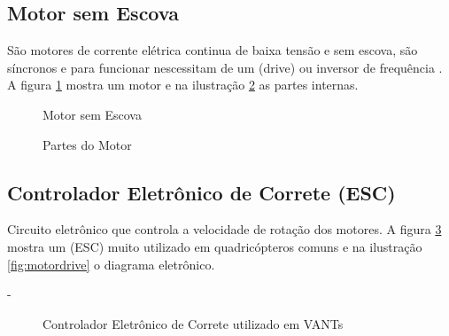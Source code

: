 \subsection{Motor sem Escova}
São motores de corrente elétrica continua de baixa tensão e sem escova, são síncronos e para funcionar nescessitam de um (drive) ou inversor de frequência \cite{vintequatro}. A figura \ref{fig:motor} mostra um motor e na ilustração \ref{fig:motorpart} as partes internas.
%
\begin{figure}[H]
	\centering
	\caption{Motor sem Escova}
	\fontsize{9pt}{12pt}\selectfont
	\def\svgwidth{13cm}
	
	\label{fig:motor}
\end{figure}


\begin{figure}[H]
	\centering
	\caption{Partes do Motor}
	\fontsize{9pt}{12pt}\selectfont
	\def\svgwidth{13cm}
	
	\label{fig:motorpart}
\end{figure}

\subsection{Controlador Eletrônico de Correte (ESC)}
Circuito eletrônico que controla a velocidade de rotação dos motores. A figura \ref{fig:esc} mostra um (ESC) muito utilizado em quadricópteros comuns e na ilustração \ref{fig:motordrive} o diagrama eletrônico.

-
\begin{figure}[H]
	\centering
	\caption{Controlador Eletrônico de Correte utilizado em VANTs}
	\fontsize{9pt}{12pt}\selectfont
	\def\svgwidth{13cm}
	
	\label{fig:esc}
\end{figure}

